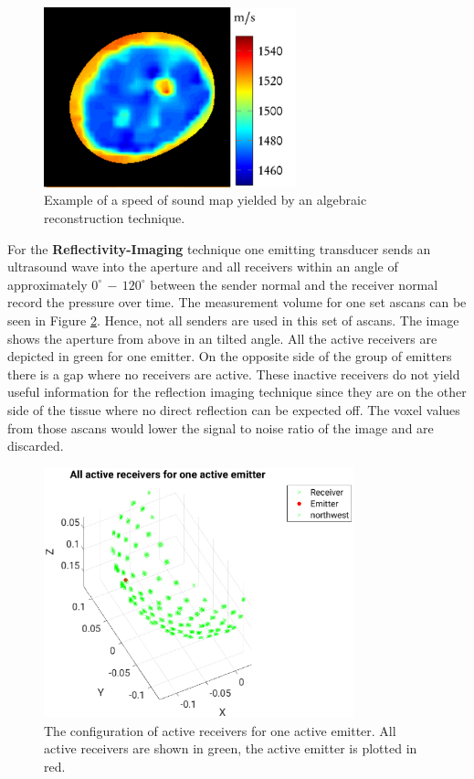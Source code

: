 \begin{figure}[H]
    \centering
    \includegraphics[width=0.65\textwidth]{Graphics/sos_example.png}
    \caption{ Example of a speed of sound map yielded by an algebraic reconstruction technique.}
    \label{sos_image}
\end{figure}


For the \textbf{Reflectivity-Imaging} technique one emitting transducer sends an ultrasound wave into the aperture and all receivers within an angle of approximately $0^{\circ} \, - \, 120^{\circ}$ between the sender normal and the receiver normal record the pressure over time. The measurement volume for one set \acp{ascan} can be seen in Figure \ref{measurement_volume}. Hence, not all senders are used in this set of \acp{ascan}. The image shows the aperture from above in an tilted angle. All the active receivers are depicted in green for one emitter. On the opposite side of the group of emitters there is a gap where no receivers are active. These inactive receivers do not yield useful information for the reflection imaging technique since they are on the other side of the tissue where no direct reflection can be expected off. The voxel values from those \acp{ascan} would lower the signal to noise ratio of the image and are discarded.


\begin{figure}[H]
    \centering
    \includegraphics[width=0.8\textwidth]{Graphics/measurement_volume.eps}
    \caption{ The configuration of active receivers for one active emitter. All active receivers are shown in green, the active emitter is plotted in red.}
    \label{measurement_volume}
\end{figure}

